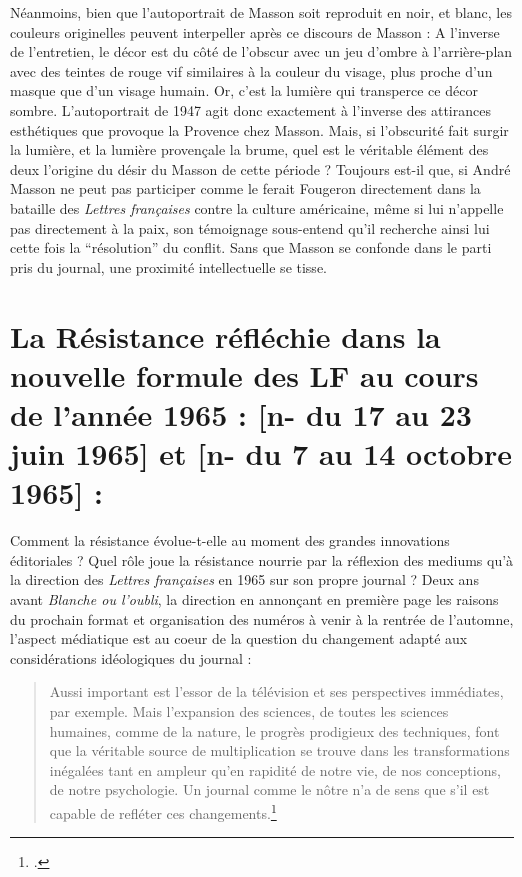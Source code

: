 
Néanmoins, bien que l’autoportrait de Masson soit reproduit en noir, et blanc, les couleurs originelles peuvent interpeller après ce discours de Masson : A l’inverse de l’entretien, le décor est du côté de l’obscur avec un jeu d’ombre à l’arrière-plan avec des teintes de rouge vif similaires à la couleur du visage, plus proche d’un masque que d’un visage humain. Or, c’est la lumière qui transperce ce décor sombre. L’autoportrait de 1947 agit donc exactement à l’inverse des attirances esthétiques que provoque la Provence chez Masson. Mais, si l’obscurité fait surgir la lumière, et la lumière provençale la brume, quel est le véritable élément des deux l’origine du désir du Masson de cette période ? Toujours est-il que, si André Masson ne peut pas participer comme le ferait Fougeron directement dans la bataille des \emph{Lettres françaises }contre la culture américaine, même si lui n’appelle pas directement à la paix, son témoignage sous-entend qu’il recherche ainsi lui cette fois la \enquote{résolution} du conflit. Sans que Masson se confonde dans le parti pris du journal, une proximité intellectuelle se tisse.  

\section{La Résistance réfléchie dans la nouvelle formule des LF au cours de l’année 1965 : [n- du 17 au 23 juin 1965] et  [n- du 7 au 14 octobre 1965] :}


Comment la résistance évolue-t-elle au moment des grandes innovations éditoriales ? Quel rôle joue la résistance nourrie par la réflexion des mediums qu’à la direction des \emph{Lettres françaises} en 1965 sur son propre journal ? Deux ans avant \emph{Blanche ou l’oubli}, la direction en annonçant en première page les raisons du prochain format et organisation des numéros à venir à la rentrée de l’automne, l’aspect médiatique est au coeur de la question du changement adapté aux considérations idéologiques du journal :

\begin{quote}
Aussi important est l’essor de la télévision et ses perspectives immédiates, par exemple. Mais l’expansion des sciences, de toutes les sciences humaines, comme de la nature, le progrès prodigieux des techniques, font que la véritable source de multiplication se trouve dans les transformations inégalées tant en ampleur qu’en rapidité de notre vie, de nos conceptions, de notre psychologie. Un journal comme le nôtre n’a de sens que s’il est capable de refléter ces changements.\footcite{nouvelleformule}\end{quote}


